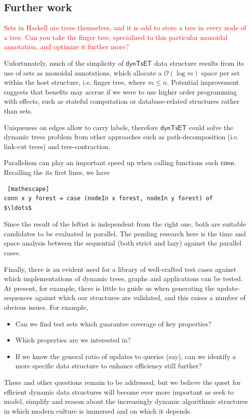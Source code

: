\documentclass{elsarticle}
\newcommand{\code}[1]{\haskell{#1}}
\newcommand{\tcr} [1]{\textcolor{red}{#1}}
\newcommand{\MATHSF}[1]{\ensuremath{\mathsf{#1}}\xspace}
\newcommand{\conn}{\MATHSF{conn}}
\newcommand{\dyntset}{\MATHSF{dynTsET}}
\renewcommand{\O}{\ensuremath{\mathcal{O}}}
\begin{document}
\subsection{Further work}

\tcr{Sets in Haskell are trees themselves, and it is odd to store a tree in every node of a tree. Can you take the finger tree, specialized to this particular monoidal annotation, and optimize it further more?}

Unfortunately, much of the simplicity of \dyntset data structure results from its use of sets as monoidal annotations, which allocate a $\O(\log m)$ space per set within the host structure, i.e. finger tree, where $m \leq n$. Potential improvement suggests that benefits may accrue if we were to use higher order programming with effects, such as stateful computation or database-related structures rather than sets.

Uniqueness on edges allow to carry labels, therefore \dyntset could solve the dynamic trees problem from other approaches such as path-decomposition (i.e. link-cut trees) and tree-contraction. 

Parallelism can play an important speed up when calling functions such \conn. Recalling the its first lines, we have
\begin{lstlisting} [mathescape]
conn x y forest = case (nodeIn x forest, nodeIn y forest) of 
$\ldots$
\end{lstlisting}
Since the result of the leftist \code{nodeIn} is independent from the right one, both are suitable candidates to be evaluated in parallel. The pending research here is the time and space analysis between the sequential (both strict and lazy) against the parallel cases.

Finally, there is an evident need for a library of well-crafted test cases against which implementations of dynamic trees, graphs and applications can be tested. At present, for example, there is little to guide us when generating the update-sequences against which our structures are validated, and this raises a number of obvious issues. For example,

\begin{itemize}
\item Can we find test sets which guarantee coverage of key properties?
\item Which properties are we interested in?
\item If we know the general ratio of updates to queries (say), can we identify a more specific data structure to enhance efficiency still further?
\end{itemize}

These and other questions remain to be addressed, but we believe the quest for efficient dynamic data structures will become ever more important as seek to model, simplify and reason about the increasingly dynamic algorithmic structures in which modern culture is immersed and on which it depends.




\end{document}

